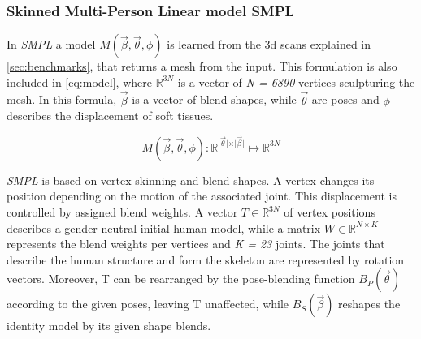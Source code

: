 \subsubsection{Skinned Multi-Person Linear model SMPL}
In \emph{SMPL} a model $M(\vec{\beta},\vec{\theta},\phi)$ is learned from the 3d scans explained in \autoref{sec:benchmarks}, that returns a mesh from the input. This formulation is also included in \autoref{eq:model}, where $\mathbb{R}^{3N}$ is a vector of \emph{N = 6890} vertices sculpturing the mesh. In this formula, $\vec{\beta}$ is a vector of blend shapes, while $\vec{\theta}$ are poses and $\phi$ describes the displacement of soft tissues.

\begin{equation}
\label{eq:model}
M(\vec{\beta},\vec{\theta},\phi) : \mathbb{R}^{\vert \vec{\theta} \vert \times \vert \vec{\beta} \vert} \mapsto \mathbb{R}^{3N}
\end{equation}

\emph{SMPL} is based on vertex skinning and blend shapes. A vertex changes its position depending on the motion of the associated joint. This displacement is controlled by assigned blend weights. A vector $T \in \mathbb{R}^{3N}$ of vertex positions describes a gender neutral initial human model, while a matrix $W \in \mathbb{R}^{N \times K}$ represents the blend weights per vertices and \emph{K = 23} joints. The joints that describe the human structure and form the skeleton are represented by rotation vectors. Moreover, T can be rearranged by the pose-blending function $B_{P}(\vec{\theta})$ according to the given poses, leaving T unaffected, while $B_{S}(\vec{\beta})$ reshapes the identity model by its given shape blends.

\cite{smpl}

